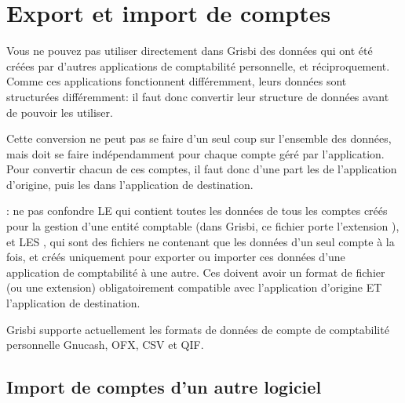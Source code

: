 

\chapter{Export et import de comptes\label{move}}

Vous ne pouvez pas utiliser directement dans Grisbi des données qui ont été créées par d'autres applications de comptabilité personnelle, et réciproquement. Comme ces applications fonctionnent différemment, leurs données sont structurées différemment: il faut donc convertir leur structure de données avant de pouvoir les utiliser. 

Cette conversion ne peut pas se faire d'un seul coup sur l'ensemble des données, mais doit se faire indépendamment pour chaque compte géré par l'application. Pour convertir chacun de ces comptes, il faut donc d'une part les  de l'application d'origine, puis les  dans l'application de destination.


 : ne pas confondre LE  qui contient toutes les données de tous les comptes créés pour la gestion d'une entité comptable (dans Grisbi, ce fichier porte l'\gls{extension} ), et LES , qui sont des fichiers ne contenant que les données d'un seul compte à la fois, et créés uniquement pour exporter ou importer ces données d'une application de comptabilité à une autre. Ces  doivent avoir un \gls{format de fichier} (ou une extension) obligatoirement compatible avec l'application d'origine ET l'application de destination.

Grisbi supporte actuellement les formats de données de compte de comptabilité personnelle \gls{Gnucash}, \gls{OFX}, \gls{CSV} et \gls{QIF}.


\section{Import de comptes d'un autre logiciel\label{move-import}}


